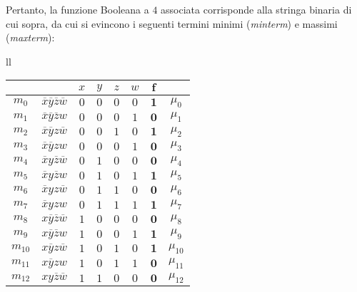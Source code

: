 \documentclass[a4paper]{extarticle}
\begin{document}
\newpage
\noindent
Pertanto, la funzione Booleana a \(4\) associata corrisponde alla stringa binaria di cui sopra, da cui si evincono i seguenti termini minimi (\emph{minterm}) e massimi (\emph{maxterm}):

\noindent
\begin{table}[H]
  \setlength{\tabcolsep}{5.6pt}
  \hspace{-1em}
  \begin{tabularx}{\textwidth}{ll}
    {
        \noindent
        \begin{tabular}{c|c||cccc||c|c}
          $ $ & $ $ & $x$ & $y$ & $z$ & $w$ & $\boldsymbol{f}$\\
          \hline
          $m_0$ & $\overline{x}\overline{y}\overline{z}\overline{w}$ & $0$ & $0$ & $0$ & $0$ & $\boldsymbol{1}$ & $\mu_0$\\
          $m_1$ & $\overline{x}\overline{y}\overline{z}w$ & $0$ & $0$ & $0$ & $1$ & $\boldsymbol{0}$ & $\mu_1$\\
          $m_2$ & $\overline{x}\overline{y}z\overline{w}$ & $0$ & $0$ & $1$ & $0$ & $\boldsymbol{1}$ & $\mu_2$\\
          $m_3$ & $\overline{x}\overline{y}zw$ & $0$ & $0$ & $0$ & $1$ & $\boldsymbol{0}$ & $\mu_3$\\
          $m_4$ & $\overline{x}y\overline{z}\overline{w}$ & $0$ & $1$ & $0$ & $0$ & $\boldsymbol{0}$ & $\mu_4$\\
          $m_5$ & $\overline{x}y\overline{z}w$ & $0$ & $1$ & $0$ & $1$ & $\boldsymbol{1}$ & $\mu_5$\\
          $m_6$ & $\overline{x}yz\overline{w}$ & $0$ & $1$ & $1$ & $0$ & $\boldsymbol{0}$ & $\mu_6$\\
          $m_7$ & $\overline{x}yzw$ & $0$ & $1$ & $1$ & $1$ & $\boldsymbol{1}$ & $\mu_7$\\
          $m_8$ & $x\overline{y}\overline{z}\overline{w}$ & $1$ & $0$ & $0$ & $0$ & $\boldsymbol{0}$ & $\mu_8$\\
          $m_9$ & $x\overline{y}\overline{z}w$ & $1$ & $0$ & $0$ & $1$ & $\boldsymbol{1}$ & $\mu_9$\\
          $m_{10}$ & $x\overline{y}z\overline{w}$ & $1$ & $0$ & $1$ & $0$ & $\boldsymbol{1}$ & $\mu_{10}$\\
          $m_{11}$ & $x\overline{y}zw$ & $1$ & $0$ & $1$ & $1$ & $\boldsymbol{0}$ & $\mu_{11}$\\
          $m_{12}$ & $xy\overline{z}\overline{w}$ & $1$ & $1$ & $0$ & $0$ & $\boldsymbol{0}$ & $\mu_{12}$\\

\end{tabular}}
\end{tabularx}
\end{table}
\end{document}
